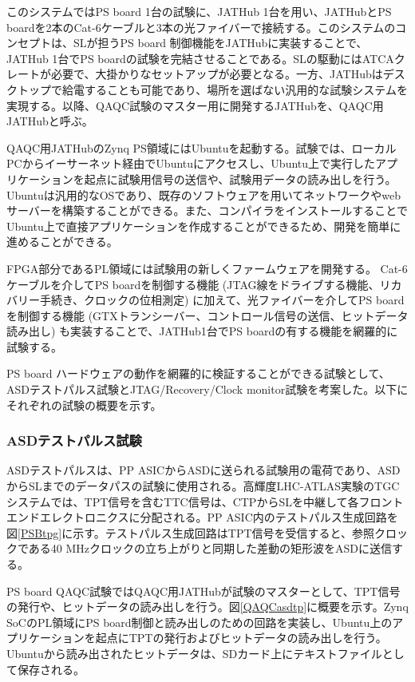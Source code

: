 このシステムではPS board 1台の試験に、JATHub 1台を用い、JATHubとPS boardを2本のCat-6ケーブルと3本の光ファイバーで接続する。このシステムのコンセプトは、SLが担うPS board 制御機能をJATHubに実装することで、JATHub 1台でPS boardの試験を完結させることである。SLの駆動にはATCAクレートが必要で、大掛かりなセットアップが必要となる。一方、JATHubはデスクトップで給電することも可能であり、場所を選ばない汎用的な試験システムを実現する。以降、QAQC試験のマスター用に開発するJATHubを、QAQC用JATHubと呼ぶ。

QAQC用JATHubのZynq PS領域にはUbuntuを起動する。試験では、ローカルPCからイーサーネット経由でUbuntuにアクセスし、Ubuntu上で実行したアプリケーションを起点に試験用信号の送信や、試験用データの読み出しを行う。Ubuntuは汎用的なOSであり、既存のソフトウェアを用いてネットワークやwebサーバーを構築することができる。また、コンパイラをインストールすることでUbuntu上で直接アプリケーションを作成することができるため、開発を簡単に進めることができる。

FPGA部分であるPL領域には試験用の新しくファームウェアを開発する。
Cat-6ケーブルを介してPS boardを制御する機能 (JTAG線をドライブする機能、リカバリー手続き、クロックの位相測定) に加えて、光ファイバーを介してPS boardを制御する機能 (GTXトランシーバー、コントロール信号の送信、ヒットデータ読み出し) も実装することで、JATHub1台でPS boardの有する機能を網羅的に試験する。

PS board ハードウェアの動作を網羅的に検証することができる試験として、ASDテストパルス試験とJTAG/Recovery/Clock monitor試験を考案した。以下にそれぞれの試験の概要を示す。

\subsubsection{ASDテストパルス試験}
\baselineskip
\label{subsubsec_testpulse}
ASDテストパルスは、PP ASICからASDに送られる試験用の電荷であり、ASDからSLまでのデータパスの試験に使用される。高輝度LHC-ATLAS実験のTGCシステムでは、TPT信号を含むTTC信号は、CTPからSLを中継して各フロントエンドエレクトロニクスに分配される。PP ASIC内のテストパルス生成回路を図\ref{PSBtpg}に示す。テストパルス生成回路はTPT信号を受信すると、参照クロックである40 MHzクロックの立ち上がりと同期した差動の矩形波をASDに送信する。


PS board QAQC試験ではQAQC用JATHubが試験のマスターとして、TPT信号の発行や、ヒットデータの読み出しを行う。図\ref{QAQCasdtp}に概要を示す。Zynq SoCのPL領域にPS board制御と読み出しのための回路を実装し、Ubuntu上のアプリケーションを起点にTPTの発行およびヒットデータの読み出しを行う。Ubuntuから読み出されたヒットデータは、SDカード上にテキストファイルとして保存される。

